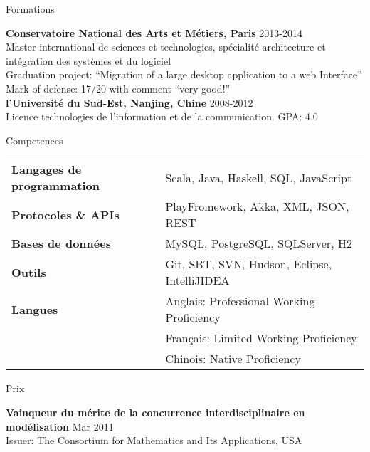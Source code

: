 \documentclass{resume} %
\begin{document}
\begin{rSection}{Formations}

{\bf Conservatoire National des Arts et Métiers, Paris} \hfill {2013-2014} \\ 
Master international de sciences et technologies, spécialité architecture et intégration des systèmes et du logiciel\\
Graduation project: ``Migration of a large desktop application to a web Interface''\\
Mark of defense: 17/20 with comment ``very good!''\medskip\\
{\bf l’Université du Sud-Est, Nanjing, Chine} \hfill {2008-2012}\\
Licence technologies de l’information et de la communication.
GPA: 4.0

\end{rSection}


\begin{rSection}{Competences}

\begin{tabular}{ @{} >{\bfseries}l @{\hspace{6ex}} l }
Langages de programmation & Scala, Java, Haskell, SQL, JavaScript \\
Protocoles \& APIs & PlayFromework, Akka, XML, JSON, REST \\
Bases de données & MySQL, PostgreSQL, SQLServer, H2 \\
Outils & Git, SBT, SVN, Hudson, Eclipse, IntelliJIDEA \\
Langues & Anglais: Professional Working Proficiency \\
        & Français: Limited Working Proficiency \\
        & Chinois: Native Proficiency 
\end{tabular}

\end{rSection}


\begin{rSection}{Prix}

{\bf Vainqueur du mérite de la concurrence interdisciplinaire en modélisation} \hfill {Mar 2011}\\
Issuer: The Consortium for Mathematics and Its Applications, USA
  
\end{rSection}
\end{document}
